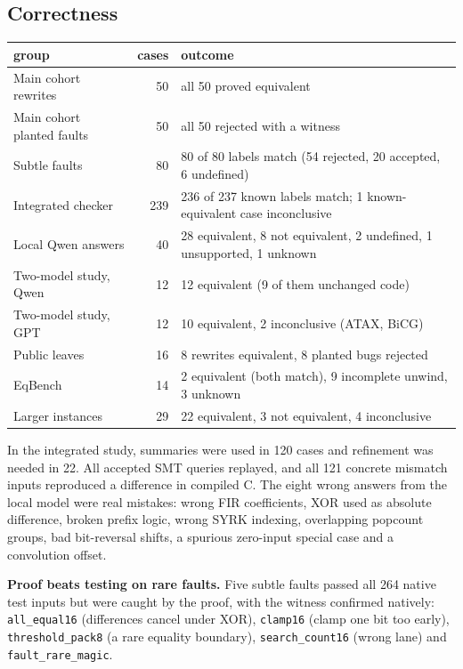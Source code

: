\documentclass[10pt,a4paper]{article}
\begin{document}
\subsection{Correctness}
\begin{center}\small
\begin{tabular}{@{}lrl@{}}\toprule
group & cases & outcome\\\midrule
Main cohort rewrites & 50 & all 50 proved equivalent\\
Main cohort planted faults & 50 & all 50 rejected with a witness\\
Subtle faults & 80 & 80 of 80 labels match (54 rejected, 20 accepted, 6 undefined)\\
Integrated checker & 239 & 236 of 237 known labels match; 1 known-equivalent case inconclusive\\
Local Qwen answers & 40 & 28 equivalent, 8 not equivalent, 2 undefined, 1 unsupported, 1 unknown\\
Two-model study, Qwen & 12 & 12 equivalent (9 of them unchanged code)\\
Two-model study, GPT & 12 & 10 equivalent, 2 inconclusive (ATAX, BiCG)\\
Public leaves & 16 & 8 rewrites equivalent, 8 planted bugs rejected\\
EqBench & 14 & 2 equivalent (both match), 9 incomplete unwind, 3 unknown\\
Larger instances & 29 & 22 equivalent, 3 not equivalent, 4 inconclusive\\\bottomrule
\end{tabular}
\end{center}
In the integrated study, summaries were used in 120 cases and refinement was needed in 22. All
accepted SMT queries replayed, and all 121 concrete mismatch inputs reproduced a difference in
compiled C. The eight wrong answers from the local model were real mistakes: wrong FIR coefficients,
XOR used as absolute difference, broken prefix logic, wrong SYRK indexing, overlapping popcount
groups, bad bit-reversal shifts, a spurious zero-input special case and a convolution offset.

\textbf{Proof beats testing on rare faults.} Five subtle faults passed all 264 native test inputs but
were caught by the proof, with the witness confirmed natively: \texttt{all\_equal16} (differences
cancel under XOR), \texttt{clamp16} (clamp one bit too early), \texttt{threshold\_pack8} (a rare
equality boundary), \texttt{search\_count16} (wrong lane) and \texttt{fault\_rare\_magic}.
\end{document}
